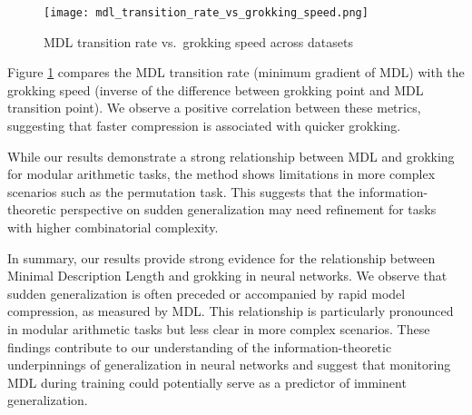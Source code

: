 \documentclass{article} %
\begin{document}
\begin{figure}[h]
\centering
\texttt{[image: mdl\_transition\_rate\_vs\_grokking\_speed.png]}
\caption{MDL transition rate vs.\ grokking speed across datasets}
\label{fig:mdl_transition_rate_vs_grokking_speed}
\end{figure}

Figure \ref{fig:mdl_transition_rate_vs_grokking_speed} compares the MDL transition rate (minimum gradient of MDL) with the grokking speed (inverse of the difference between grokking point and MDL transition point). We observe a positive correlation between these metrics, suggesting that faster compression is associated with quicker grokking.

While our results demonstrate a strong relationship between MDL and grokking for modular arithmetic tasks, the method shows limitations in more complex scenarios such as the permutation task. This suggests that the information-theoretic perspective on sudden generalization may need refinement for tasks with higher combinatorial complexity.

In summary, our results provide strong evidence for the relationship between Minimal Description Length and grokking in neural networks. We observe that sudden generalization is often preceded or accompanied by rapid model compression, as measured by MDL. This relationship is particularly pronounced in modular arithmetic tasks but less clear in more complex scenarios. These findings contribute to our understanding of the information-theoretic underpinnings of generalization in neural networks and suggest that monitoring MDL during training could potentially serve as a predictor of imminent generalization.
\end{document}
